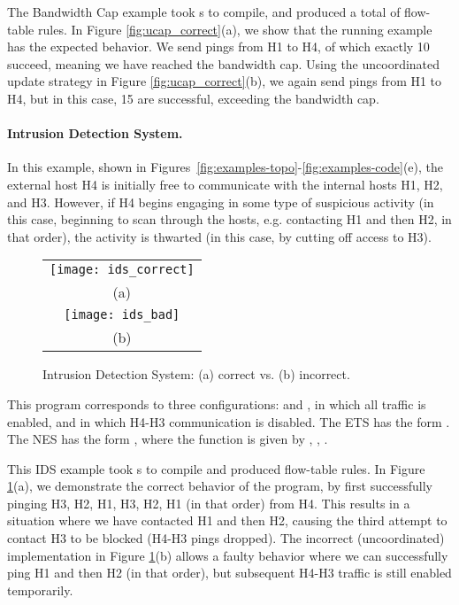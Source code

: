 \documentclass[pldi-cameraready]{sigplanconf}
\begin{document}
The Bandwidth Cap example took s to compile, and produced a total of  flow-table rules.
In Figure \ref{fig:ucap_correct}(a), we show that the running example has
the expected behavior. We send pings from H1 to H4, of which exactly 10 succeed, meaning we have
reached the bandwidth cap.
Using the uncoordinated update strategy in Figure \ref{fig:ucap_correct}(b), we again send pings
from H1 to H4, but in this case, 15 are successful, exceeding the bandwidth cap.

\paragraph{Intrusion Detection System.} In this example, shown in Figures~\ref{fig:examples-topo}-\ref{fig:examples-code}(e),
the external host H4 is initially free to communicate with the internal hosts H1, H2, and H3.
However, if H4 begins engaging in some type of suspicious activity (in this case,
beginning to scan through the hosts, e.g. contacting H1 and then H2, in that order),
the activity is thwarted (in this case, by cutting off access to H3).

\begin{figure}
\centering
\bgroup
\def\arraystretch{0.5}
\begin{tabular}{c}
\texttt{[image: ids\_correct]} \\
{\scriptsize (a)} \\
\texttt{[image: ids\_bad]} \\
{\scriptsize (b)}
\end{tabular}
\egroup
\caption{Intrusion Detection System: (a) correct vs. (b) incorrect.}
\label{fig:ids_correct}
\end{figure}

This program  corresponds to three configurations:
 and
, in which all traffic is enabled,
and  in which H4-H3 communication is disabled.
The ETS has the form .
The NES has the form ,
where the  function is given by , , .

This IDS example took s to compile and produced  flow-table rules.
In Figure \ref{fig:ids_correct}(a), we demonstrate the correct behavior of the
program, by first successfully pinging H3, H2, H1, H3, H2, H1 (in that order) from H4.
This results in a situation where we have contacted H1 and then H2, causing the third attempt to
contact H3 to be blocked (H4-H3 pings dropped).
The incorrect (uncoordinated) implementation in Figure \ref{fig:ids_correct}(b) allows a faulty
behavior where we can successfully ping H1 and then H2 (in that order), but subsequent H4-H3 traffic is
still enabled temporarily.
\end{document}
